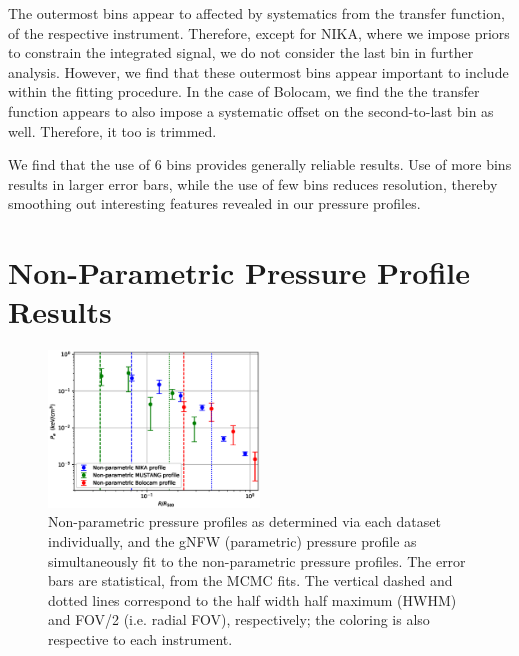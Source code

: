 \documentclass[twocolumn,traditabstract]{aa}
\begin{document}
The outermost bins appear to affected by systematics from the transfer function, of the respective instrument.
Therefore, except for NIKA, where we impose priors to constrain the integrated signal, we do not consider the
last bin in further analysis. However, we find that these outermost bins appear important to include within the
fitting procedure. In the case of Bolocam, we find the the transfer function appears to also impose a systematic
offset on the second-to-last bin as well. Therefore, it too is trimmed.

We find that the use of 6 bins provides generally reliable results. Use of more bins results in larger error bars, while
the use of few bins reduces resolution, thereby smoothing out interesting features revealed in our pressure profiles.

\section{Non-Parametric Pressure Profile Results}
\label{sec:np_res}

\begin{figure}[!h]
  \centering
  \includegraphics[width=0.5\textwidth]{NIKA_ml_deproj_figs/Real_Joint_gNFW_Power_Real_11011111_2500S_500B_100W_non_parametric_pressure_p16cosmo.eps}
  \caption{Non-parametric pressure profiles as determined via each dataset individually, and the gNFW (parametric)
    pressure profile as simultaneously fit to the non-parametric pressure profiles. The error bars are statistical,
    from the MCMC fits. The vertical dashed and dotted lines correspond to the half width half maximum (HWHM) and
    FOV/2 (i.e. radial FOV), respectively; the coloring is also respective to each instrument.}
  \label{fig:joint_pressure}
\end{figure}
\end{document}
